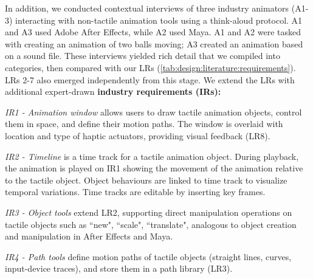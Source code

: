 In addition, we conducted contextual interviews of three industry animators (A1-3) interacting with non-tactile animation tools using a think-aloud protocol.
A1 and A3 used Adobe After Effects, while A2 used Maya.
A1 and A2 were tasked with creating an animation of two balls moving; A3 created an animation based on a sound file.
These interviews yielded rich detail that we %
 compiled into %
 categories, then compared with our LRs %
(\autoref{tab:design:literature:requirements}). LRs 2-7 also emerged independently from this stage.
We extend the LRs with additional expert-drawn {\bf industry requirements (IRs):} %

\emph{IR1 - Animation window} allows users to draw tactile animation objects, control them in space, and define their motion paths.
The window is overlaid with location and type of haptic actuators, providing visual feedback (LR8).
		
\emph{IR2 - Timeline} is a time track for a tactile animation object.
During playback, the animation is played on IR1 showing the movement of the animation relative to the tactile object.
Object behaviours are linked to time track to visualize temporal variations.
Time tracks are editable by inserting key frames.%

\emph{IR3 - Object tools} extend LR2,
supporting direct manipulation operations on  tactile objects such as 
``new", ``scale", ``translate", %
analogous to object creation and manipulation in After Effects and Maya. 

		
\emph{IR4 - Path tools} define motion paths of tactile objects (straight lines, curves, input-device traces), and store them in a path  library (LR3).
		 
